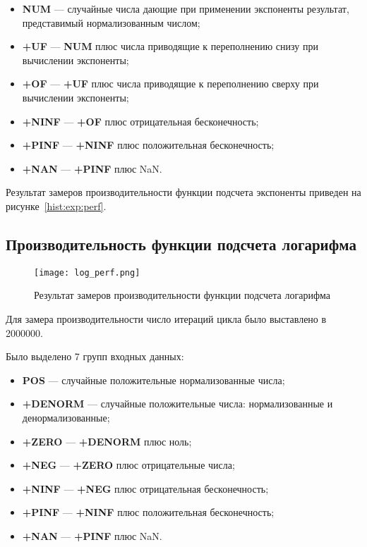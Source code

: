 \begin{itemize}
    \item \textbf{NUM} --- случайные числа дающие при применении экспоненты результат, представимый нормализованным числом;
    \item \textbf{+UF} --- \textbf{NUM} плюс числа приводящие к переполнению снизу при вычислении экспоненты;
    \item \textbf{+OF} --- \textbf{+UF} плюс числа приводящие к переполнению сверху при вычислении экспоненты;
    \item \textbf{+NINF} --- \textbf{+OF} плюс отрицательная бесконечность;
    \item \textbf{+PINF} --- \textbf{+NINF} плюс положительная бесконечность;
    \item \textbf{+NAN} --- \textbf{+PINF} плюс NaN.
\end{itemize}

Результат замеров производительности функции подсчета экспоненты приведен на рисунке~\ref{hist:exp:perf}.


\subsection{Производительность функции подсчета логарифма}

\begin{figure}[hbt]
    \centering
    \texttt{[image: log\_perf.png]}
    \caption{Результат замеров производительности функции подсчета логарифма}
    \label{hist:log:perf}
\end{figure}

Для замера производительности число итераций цикла было выставлено в 2000000.

Было выделено 7 групп входных данных:

\begin{itemize}
    \item \textbf{POS} --- случайные положительные нормализованные числа;
    \item \textbf{+DENORM} --- случайные положительные числа: нормализованные и денормализованные;
    \item \textbf{+ZERO} --- \textbf{+DENORM} плюс ноль;
    \item \textbf{+NEG} --- \textbf{+ZERO} плюс отрицательные числа;
    \item \textbf{+NINF} --- \textbf{+NEG} плюс отрицательная бесконечность;
    \item \textbf{+PINF} --- \textbf{+NINF} плюс положительная бесконечность;
    \item \textbf{+NAN} --- \textbf{+PINF} плюс NaN.
\end{itemize}

